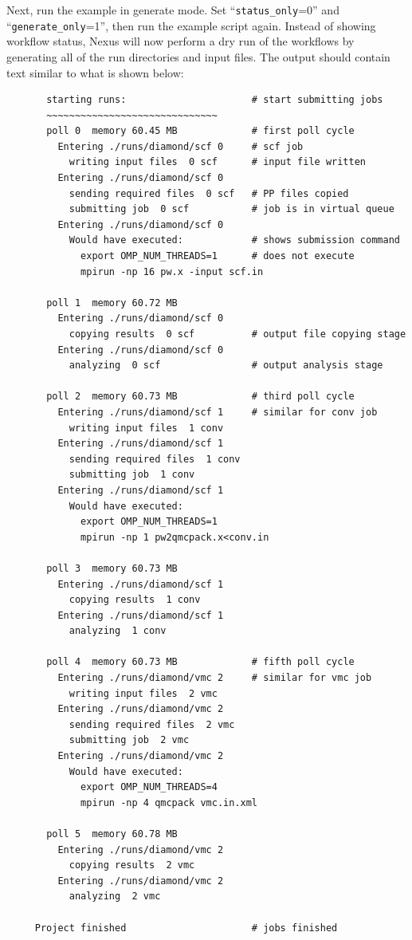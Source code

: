 \documentclass[oneside,11pt]{memoir}
\numberwithin{equation}{section}
\begin{document}
Next, run the example in generate mode.  Set ``\texttt{status\_only}=0'' and ``\texttt{generate\_only}=1'', then run the example script again.  Instead of showing workflow status, Nexus will now perform a dry run of the workflows by generating all of the run directories and input files.  The output should contain text similar to what is shown below:
\begin{shaded}
\begin{verbatim}
       starting runs:                      # start submitting jobs
       ~~~~~~~~~~~~~~~~~~~~~~~~~~~~~~ 
       poll 0  memory 60.45 MB             # first poll cycle
         Entering ./runs/diamond/scf 0     # scf job
           writing input files  0 scf      # input file written
         Entering ./runs/diamond/scf 0 
           sending required files  0 scf   # PP files copied
           submitting job  0 scf           # job is in virtual queue
         Entering ./runs/diamond/scf 0 
           Would have executed:            # shows submission command
             export OMP_NUM_THREADS=1      # does not execute
             mpirun -np 16 pw.x -input scf.in 
     
       poll 1  memory 60.72 MB 
         Entering ./runs/diamond/scf 0 
           copying results  0 scf          # output file copying stage
         Entering ./runs/diamond/scf 0 
           analyzing  0 scf                # output analysis stage
     
       poll 2  memory 60.73 MB             # third poll cycle
         Entering ./runs/diamond/scf 1     # similar for conv job
           writing input files  1 conv 
         Entering ./runs/diamond/scf 1 
           sending required files  1 conv 
           submitting job  1 conv 
         Entering ./runs/diamond/scf 1 
           Would have executed:  
             export OMP_NUM_THREADS=1
             mpirun -np 1 pw2qmcpack.x<conv.in 
     
       poll 3  memory 60.73 MB 
         Entering ./runs/diamond/scf 1 
           copying results  1 conv 
         Entering ./runs/diamond/scf 1 
           analyzing  1 conv 
     
       poll 4  memory 60.73 MB             # fifth poll cycle
         Entering ./runs/diamond/vmc 2     # similar for vmc job
           writing input files  2 vmc 
         Entering ./runs/diamond/vmc 2 
           sending required files  2 vmc 
           submitting job  2 vmc 
         Entering ./runs/diamond/vmc 2 
           Would have executed:  
             export OMP_NUM_THREADS=4
             mpirun -np 4 qmcpack vmc.in.xml 
     
       poll 5  memory 60.78 MB 
         Entering ./runs/diamond/vmc 2 
           copying results  2 vmc 
         Entering ./runs/diamond/vmc 2 
           analyzing  2 vmc 
     
     Project finished                      # jobs finished
\end{verbatim}
\end{shaded}
\end{document}

